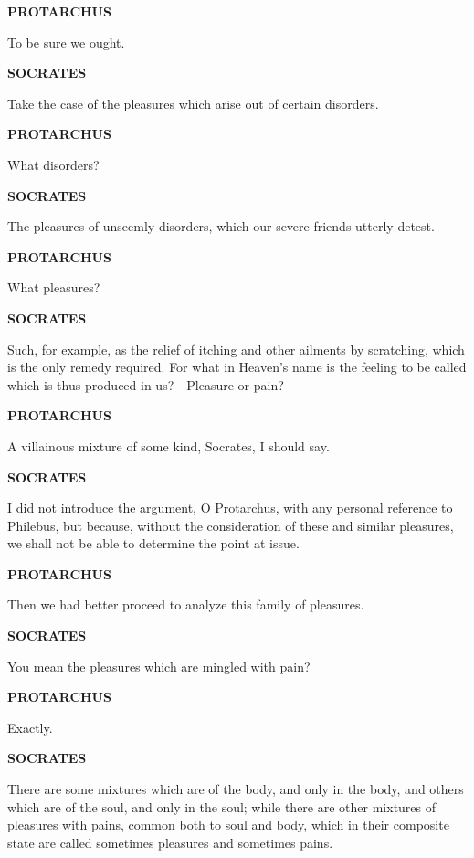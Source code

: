 \documentclass[11pt,letter]{article}
\begin{document}
\par \textbf{PROTARCHUS}
\par   To be sure we ought.

\par \textbf{SOCRATES}
\par   Take the case of the pleasures which arise out of certain disorders.

\par \textbf{PROTARCHUS}
\par   What disorders?

\par \textbf{SOCRATES}
\par   The pleasures of unseemly disorders, which our severe friends utterly detest.

\par \textbf{PROTARCHUS}
\par   What pleasures?

\par \textbf{SOCRATES}
\par   Such, for example, as the relief of itching and other ailments by scratching, which is the only remedy required. For what in Heaven's name is the feeling to be called which is thus produced in us?—Pleasure or pain?

\par \textbf{PROTARCHUS}
\par   A villainous mixture of some kind, Socrates, I should say.

\par \textbf{SOCRATES}
\par   I did not introduce the argument, O Protarchus, with any personal reference to Philebus, but because, without the consideration of these and similar pleasures, we shall not be able to determine the point at issue.

\par \textbf{PROTARCHUS}
\par   Then we had better proceed to analyze this family of pleasures.

\par \textbf{SOCRATES}
\par   You mean the pleasures which are mingled with pain?

\par \textbf{PROTARCHUS}
\par   Exactly.

\par \textbf{SOCRATES}
\par   There are some mixtures which are of the body, and only in the body, and others which are of the soul, and only in the soul; while there are other mixtures of pleasures with pains, common both to soul and body, which in their composite state are called sometimes pleasures and sometimes pains.
\end{document}

